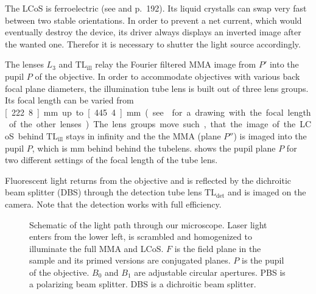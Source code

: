 The LCoS is ferroelectric (see \cite{Saleh1991} and \cite{Goodman1996}
p.~192).  Its liquid crystalls can swap very fast between two stable
orientations. In order to prevent a net current, which would
eventually destroy the device, its driver always displays an inverted
image after the wanted one. Therefor it is necessary to shutter the
light source accordingly.

The lenses $L_3$ and $\textrm{TL}_\textrm{ill}$ relay the Fourier
filtered MMA image from $P'$ into the pupil $P$ of the objective. In
order to accommodate objectives with various back focal plane
diameters, the illumination tube lens is built out of three lens
groups. Its focal length can be varied from \unit[222.8]{mm} up to
\unit[445.4]{mm} (see  for a drawing with the
focal length of the other lenses). The lens groups move such, that the
image of the LCoS behind $\textrm{TL}_\textrm{ill}$ stays in infinity
and the the MMA (plane $P''$) is imaged into the pupil $P$, which is
\unit[250]{mm} behind behind the tubelens. 
shows the pupil plane $P$ for two different settings of the focal
length of the tube lens.

Fluorescent light returns from the objective and is reflected by the
dichroitic beam splitter (DBS) through the detection tube lens
$\textrm{TL}_\textrm{det}$ and is imaged on the camera. Note that the
detection works with full efficiency.

\begin{figure}[!hbt]
  \centering
  \def\svgscale{2}
  
  \caption{Schematic of the light path through our microscope. Laser
    light enters from the lower left, is scrambled and homogenized to
    illuminate the full MMA and LCoS. $F$ is the field plane in the
    sample and its primed versions are conjugated planes. $P$ is the
    pupil of the objective. $B_0$ and $B_1$ are adjustable circular
    apertures. PBS is a polarizing beam splitter. DBS is a dichroitic
    beam splitter.}
  \label{fig:memi-real}
\end{figure}




